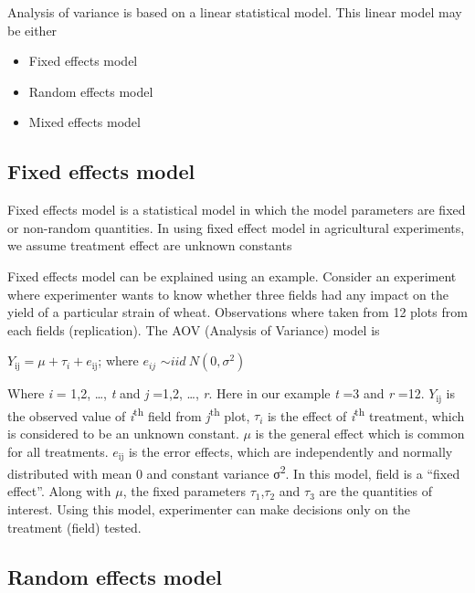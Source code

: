 \documentclass[
]{book}
\begin{document}
Analysis of variance is based on a linear statistical model. This linear model may be either

\begin{itemize}
\item
  Fixed effects model
\item
  Random effects model
\item
  Mixed effects model
\end{itemize}

\hypertarget{fix}{%
\subsection{Fixed effects model}\label{fix}}

Fixed effects model is a statistical model in which the model parameters
are fixed or non-random quantities. In using fixed effect model in
agricultural experiments, we assume treatment effect are unknown
constants

Fixed effects model can be explained using an example. Consider an
experiment where experimenter wants to know whether three fields had any
impact on the yield of a particular strain of wheat. Observations where
taken from 12 plots from each fields (replication). The AOV (Analysis of
Variance) model is

\(Y_{\text{ij}} = \mu + \tau_{i} + e_{\text{ij}}\); where \(e_{ij}\) \(\sim iid\ N(0,\sigma^{2})\)

Where \emph{i} = 1,2, \ldots, \emph{t} and \emph{j} =1,2, \ldots, \emph{r}. Here in our example
\emph{t} =3 and \emph{r} =12. \(Y_{\text{ij}}\) is the observed value of \emph{i}\textsuperscript{th}
field from \emph{j}\textsuperscript{th} plot, \(\tau_{i}\) is the effect of \emph{i}\textsuperscript{th} treatment,
which is considered to be an unknown constant. \(\mu\) is the general
effect which is common for all treatments. \(e_{\text{ij}}\) is the error
effects, which are independently and normally distributed with mean 0
and constant variance σ\textsuperscript{2}. In this model, field is a ``fixed effect''.
Along with \(\mu\), the fixed parameters \(\tau_{1}\),\(\tau_{2}\) and
\(\tau_{3}\) are the quantities of interest. Using this model,
experimenter can make decisions only on the treatment (field) tested.

\hypertarget{random-effects-model}{%
\subsection{Random effects model}\label{random-effects-model}}
\end{document}
